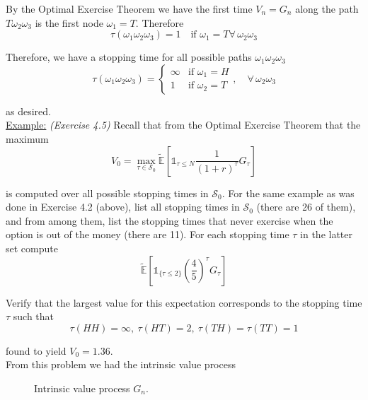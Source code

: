 \documentclass[12pt]{article}
\newlength\tindent
\renewcommand{\indent}{\hspace*{\tindent}}
\newcommand{\E}{\mathbb E}
\begin{document}
\indent By the Optimal Exercise Theorem we have the first time $V_n = G_n$ along the path $T\omega_2\omega_3$ is the first node $\omega_1 = T$. Therefore
\begin{equation*}
	\tau(\omega_1\omega_2\omega_3) = 1 \quad \text{if } \omega_1 = T \forall\,\omega_2\omega_3
\end{equation*}

Therefore, we have a stopping time for all possible paths $\omega_1\omega_2\omega_3$
\begin{equation*}
	\tau(\omega_1\omega_2\omega_3) = 
	\begin{cases}
		\infty & \text{if } \omega_1 = H \\
		1 & \text{if } \omega_2 = T
	\end{cases}, 
	\quad \forall\,\omega_2\omega_3
\end{equation*}

as desired. \\

\underline{Example:} {\em (Exercise 4.5)} Recall that from the Optimal Exercise Theorem that the maximum 
\begin{equation*}
	V_0 = \max_{\tau \in \mathcal S_0} \tilde{\E} \left[ \mathds 1_{\tau \leq N} \frac{1}{(1 + r)^\tau} G_\tau \right]
\end{equation*}

is computed over all possible stopping times in $\mathcal S_0$. For the same example as was done in Exercise 4.2 (above), list all stopping times in $\mathcal S_0$ (there are 26 of them), and from among them, list the stopping times that never exercise when the option is out of the money (there are 11). For each stopping time $\tau$ in the latter set compute
\begin{equation*}
	\tilde{\E} \left[ \mathds 1_{\{\tau \leq 2\}} \left(\frac{4}{5}\right)^\tau G_\tau \right]
\end{equation*}

Verify that the largest value for this expectation corresponds to the stopping time $\tau$ such that
\begin{equation*}
	\tau(HH) = \infty,~\tau(HT) = 2,~\tau(TH) = \tau(TT) = 1
\end{equation*}

found to yield $V_0  = 1.36$. \\

From this problem we had the intrinsic value process
\begin{figure}[H]
\centering
{}
\caption{Intrinsic value process $G_n$.}
\end{figure}
\end{document}
